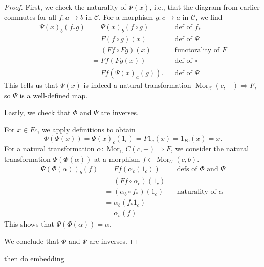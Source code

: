 \documentclass[12pt]{article}
\theoremstyle{definition}
\newcommand{\<}{\langle}
\renewcommand{\>}{\rangle}
\newcommand{\CC}{\mathcal{C}}
\DeclareMathOperator{\Mor}{Mor}
\newcommand{\nato}{\Rightarrow}
\begin{document}
\begin{proof}
    First, we check the naturality of $\Psi(x)$, i.e., that the diagram from earlier commutes for all $f : a \to b$ in $\CC$.
    For a morphism $g : c \to a$ in $\CC$, we find
    \begin{align*}
        \Psi(x)_b(f_* g)
            &= \Psi(x)_b(f \circ g) &&\text{def of } f_* \\
            &= F(f \circ g)(x) &&\text{def of } \Psi \\
            &= (Ff \circ Fg)(x) &&\text{functorality of } F \\
            &= Ff(Fg(x)) &&\text{def of } \circ \\
            &= Ff(\Psi(x)_a(g)). &&\text{def of } \Psi
    \end{align*}
    This tells us that $\Psi(x)$ is indeed a natural transformation $\Mor_\CC(c, -) \nato F$, so $\Psi$ is a well-defined map.

    Lastly, we check that $\Phi$ and $\Psi$ are inverses.

    For $x \in Fc$, we apply definitions to obtain
    \[
        \Phi(\Psi(x))
            = \Psi(x)_c(1_c)
            = F1_c(x)
            = 1_{Fc}(x)
            = x.
    \]
    For a natural transformation $\alpha : \Mor_CC(c, -) \nato F$, we consider the natural transformation $\Psi(\Phi(\alpha))$ at a morphism $f \in \Mor_\CC(c, b)$.
    \begin{align*}
        \Psi(\Phi(\alpha))_b(f)
            &= Ff(\alpha_c(1_c)) &&\text{defs of $\Phi$ and $\Psi$}\\
            &= (Ff \circ \alpha_c)(1_c) \\
            &= (\alpha_b \circ f_*)(1_c) &&\text{naturality of } \alpha \\
            &= \alpha_b(f_* 1_c) \\
            &= \alpha_b(f)
    \end{align*}
    This shows that $\Psi(\Phi(\alpha)) = \alpha$.

    We conclude that $\Phi$ and $\Psi$ are inverses.
\end{proof}


\color{red}{remains to prove naturality in $c$ and $F$}

then do embedding
\end{document}
